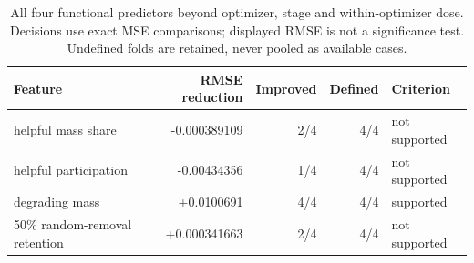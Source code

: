{\begin{table}[t]
\end{table}
\begin{table}[t]
\centering\small
\begin{tabular}{lrrrl}\toprule
Feature & RMSE reduction & Improved & Defined & Criterion \\
\midrule
helpful mass share & -0.000389109 & 2/4 & 4/4 & not supported \\
helpful participation & -0.00434356 & 1/4 & 4/4 & not supported \\
degrading mass & +0.0100691 & 4/4 & 4/4 & supported \\
50\% random-removal retention & +0.000341663 & 2/4 & 4/4 & not supported \\
\bottomrule\end{tabular}
\caption{All four functional predictors beyond optimizer, stage and within-optimizer dose. Decisions use exact MSE comparisons; displayed RMSE is not a significance test. Undefined folds are retained, never pooled as available cases.}
\end{table}%
}
